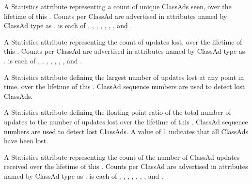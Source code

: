 \begin{description}
\item[\AdAttr{UpdatesInitial}:] A Statistics attribute representing
  a count of unique ClassAds seen,
  over the lifetime of this .
  Counts per ClassAd are advertised in attributes named by ClassAd type
  as .
   is each of , ,
  , , , ,
  , and .

\item[\AdAttr{UpdatesLost}:] A Statistics attribute representing
  the count of updates lost,
  over the lifetime of this .
  Counts per ClassAd are advertised in attributes named by ClassAd type
  as .
   is each of , ,
  , , , ,
  , and .

\item[\AdAttr{UpdatesLostMax}:] A Statistics attribute defining
  the largest number of updates lost at any point in time, 
  over the lifetime of this .
  ClassAd sequence numbers are used to detect lost ClassAds.

\item[\AdAttr{UpdatesLostRatio}:] A Statistics attribute defining
  the floating point ratio of the total number of updates to
  the number of updates lost 
  over the lifetime of this .
  ClassAd sequence numbers are used to detect lost ClassAds.
  A value of 1 indicates that all ClassAds have been lost.

\item[\AdAttr{UpdatesTotal}:] A Statistics attribute representing the
  count of the number of ClassAd updates received
  over the lifetime of this .
  Counts per ClassAd are advertised in attributes named by ClassAd type
  as .
   is each of , ,
  , , , ,
  , and .

\end{description}


